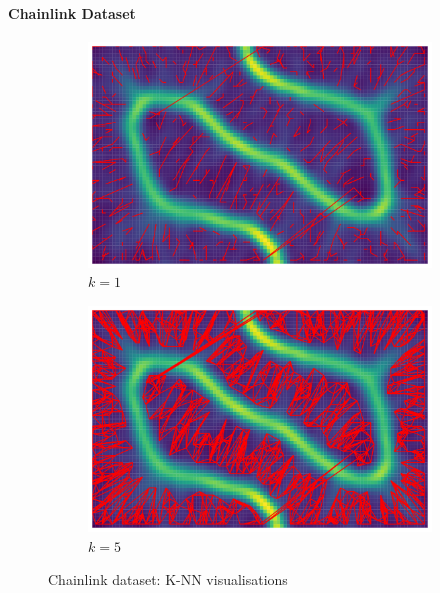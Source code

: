 \documentclass[12pt]{article}
\begin{document}
\paragraph*{Chainlink Dataset}
\begin{figure}[t]
    \centering
    \begin{subfigure}{.5\textwidth}
      \centering
      \includegraphics[width=.9\linewidth]{vis/chainlink_k_1.png}
      \caption{$k=1$}
      \label{fig:chainlinkk1}
    \end{subfigure}%
    \begin{subfigure}{.5\textwidth}
      \centering
      \includegraphics[width=.9\linewidth]{vis/chainlink_k_5.png}
      \caption{$k=5$}
      \label{fig:chainlinkk5}
    \end{subfigure}
    \caption{Chainlink dataset: K-NN visualisations}
    \label{fig:chainlinkknn}
\end{figure}
\end{document}
